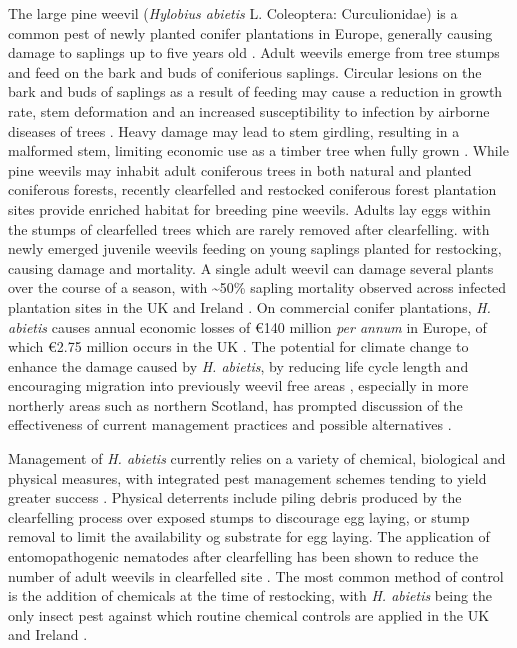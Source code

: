\documentclass[a4paper, 11pt]{article}
\begin{document}
The large pine weevil (\textit{Hylobius abietis} L. Coleoptera: Curculionidae) is a common pest of newly planted conifer plantations in Europe, generally causing damage to saplings up to five years old \citep{Dillon2008}. Adult weevils emerge from tree stumps and feed on the bark and buds of coniferious saplings. Circular lesions on the bark and buds of saplings as a result of feeding may cause a reduction in growth rate, stem deformation and an increased susceptibility to infection by airborne diseases of trees \citep{Leather1999}. Heavy damage may lead to stem girdling, resulting in a malformed stem, limiting economic use as a timber tree when fully grown \citep{}. While pine weevils may inhabit adult coniferous trees in both natural and planted coniferous forests, recently clearfelled and restocked coniferous forest plantation sites provide enriched habitat for breeding pine weevils. Adults lay eggs within the stumps of clearfelled trees which are rarely removed after clearfelling. with newly emerged juvenile weevils feeding on young saplings planted for restocking, causing damage and mortality. A single adult weevil can damage several plants over the course of a season, with \textasciitilde{}50\% sapling mortality observed across infected plantation sites in the UK and Ireland \citep{Heritage2001}. On commercial conifer plantations, \textit{H. abietis} causes annual economic losses of \euro{}140 million \textit{per annum} in Europe, of which \euro{}2.75 million occurs in the UK \citep{Evans2015}. The potential for climate change to enhance the damage caused by \textit{H. abietis}, by reducing life cycle length \citep{} and encouraging migration into previously weevil free areas \citep{}, especially in more northerly areas such as northern Scotland, has prompted discussion of the effectiveness of current management practices and possible alternatives \citep{}.

Management of \textit{H. abietis} currently relies on a variety of chemical, biological and physical measures, with integrated pest management schemes tending to yield greater success \citep{}. Physical deterrents include piling debris produced by the clearfelling process over exposed stumps to discourage egg laying, or stump removal to limit the availability og substrate for egg laying. The application of entomopathogenic nematodes after clearfelling has been shown to reduce the number of adult weevils in clearfelled site \citep{Dillon2006}. The most common method of control is the addition of chemicals at the time of restocking, with \textit{H. abietis} being the only insect pest against which routine chemical controls are applied in the UK and Ireland \citep{Willoughby2004}.  
\end{document}
